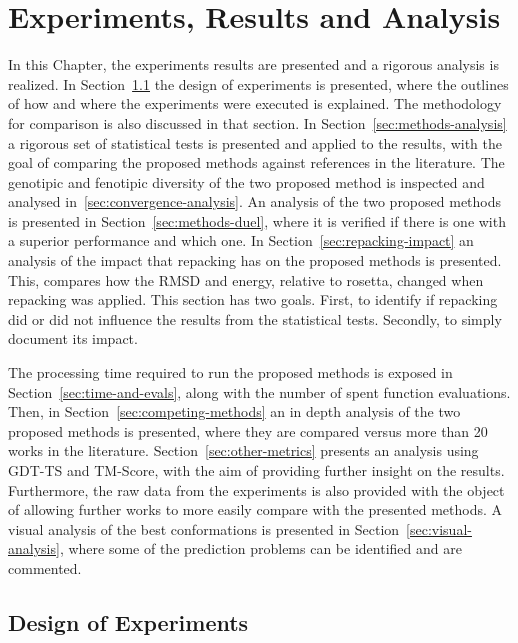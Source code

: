 \chapter{Experiments, Results and Analysis}\label{chap:experiments_and_results}

In this Chapter, the experiments results are presented and a rigorous
analysis is realized. In Section~\ref{sec:design_of_experiments}
the design of experiments is presented, where the outlines of how
and where the experiments were executed is explained. The methodology
for comparison is also discussed in that section. In
Section~\ref{sec:methods-analysis} a rigorous set of statistical
tests is presented and applied to the results, with the goal of
comparing the proposed methods against references in the literature.
The genotipic and fenotipic diversity of the two proposed method is
inspected and analysed in~\ref{sec:convergence-analysis}.
An analysis of the two proposed methods is presented in
Section~\ref{sec:methods-duel}, where it is verified if there is one with a
superior performance and which one.
In Section~\ref{sec:repacking-impact} an analysis of the impact that
repacking has on the proposed methods is presented. This, compares how
the RMSD and energy, relative to rosetta, changed when repacking was
applied. This section has two goals. First, to identify if repacking
did or did not influence the results from the statistical tests.
Secondly, to simply document its impact.

The processing time required to run the proposed methods is exposed in
Section~\ref{sec:time-and-evals}, along with the number of spent function
evaluations. Then, in Section~\ref{sec:competing-methods} an in depth
analysis of the two proposed methods is presented, where they are
compared versus more than 20 works in the literature.
Section~\ref{sec:other-metrics} presents an analysis using GDT-TS
and TM-Score, with the aim of providing further insight on the results.
Furthermore, the raw data from the experiments is also provided with
the object of allowing further works to more easily compare with the
presented methods. A visual analysis of the best conformations is
presented in Section~\ref{sec:visual-analysis}, where some of the
prediction problems can be identified and are commented.

\section{Design of Experiments}\label{sec:design_of_experiments}

